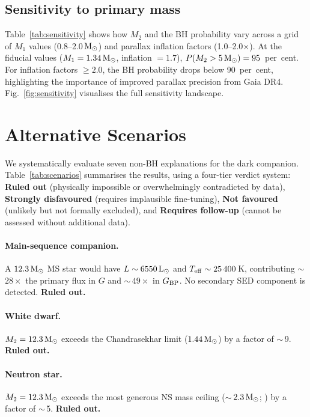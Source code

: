 \documentclass[usenatbib,fleqn]{mnras}
\newcommand{\Msun}{{\rm M}_\odot}
\newcommand{\Lsun}{{\rm L}_\odot}
\begin{document}
\subsection{Sensitivity to primary mass}
\label{sec:results:sensitivity}

Table~\ref{tab:sensitivity} shows how $M_2$ and the BH
probability vary across a grid of $M_1$ values
(0.8--2.0\,$\Msun$) and parallax inflation factors
(1.0--2.0$\times$).  At the fiducial values ($M_1 = 1.34\,\Msun$,
inflation $= 1.7$), $P(M_2 > 5\,\Msun) = 95$~per~cent.
For inflation factors $\geq 2.0$, the BH probability drops
below 90~per~cent, highlighting the importance of improved
parallax precision from Gaia DR4.
Fig.~\ref{fig:sensitivity} visualises the full sensitivity
landscape.

\section{Alternative Scenarios}
\label{sec:alternatives}

We systematically evaluate seven non-BH explanations for the dark
companion.  Table~\ref{tab:scenarios} summarises the results,
using a four-tier verdict system: \textbf{Ruled out} (physically
impossible or overwhelmingly contradicted by data),
\textbf{Strongly disfavoured} (requires implausible fine-tuning),
\textbf{Not favoured} (unlikely but not formally excluded),
and \textbf{Requires follow-up} (cannot be assessed without
additional data).

\paragraph{Main-sequence companion.}
A $12.3\,\Msun$ MS star would have $L \sim 6550\,\Lsun$ and
$T_{\rm eff} \sim 25\,400$\,K, contributing $\sim$\,$28\times$ the
primary flux in $G$ and $\sim$\,$49\times$ in $G_{\rm BP}$.
No secondary SED component is detected.  \textbf{Ruled out.}

\paragraph{White dwarf.}
$M_2 = 12.3\,\Msun$ exceeds the Chandrasekhar limit
($1.44\,\Msun$) by a factor of $\sim$\,9.  \textbf{Ruled out.}

\paragraph{Neutron star.}
$M_2 = 12.3\,\Msun$ exceeds the most generous NS mass ceiling
($\sim$\,$2.3\,\Msun$; \citealt{Rezzolla2018}) by a factor of
$\sim$\,5.  \textbf{Ruled out.}
\end{document}
